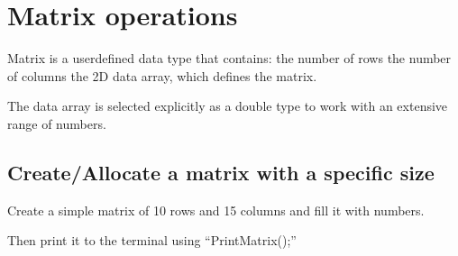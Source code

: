 \documentclass[letterpaper,10pt,english]{sphinxmanual}
\begin{document}
\chapter{Matrix operations}
\label{\detokenize{GettingStartedInC:matrix-operations}}
\sphinxAtStartPar
Matrix is a user\sphinxhyphen{}defined data type that contains:
\sphinxhyphen{} the number of rows
\sphinxhyphen{} the number of columns
\sphinxhyphen{} the 2D data array, which defines the matrix.

\sphinxAtStartPar
The data array is selected explicitly as a double type to work with an extensive range of numbers.

\begin{sphinxVerbatim}[commandchars=\\\{\}]
\end{sphinxVerbatim}


\section{Create/Allocate a matrix with a specific size}
\label{\detokenize{GettingStartedInC:create-allocate-a-matrix-with-a-specific-size}}
\sphinxAtStartPar
Create a simple matrix of 10 rows and 15 columns and fill it with numbers.

\sphinxAtStartPar
Then print it to the terminal using “PrintMatrix();”
\end{document}
